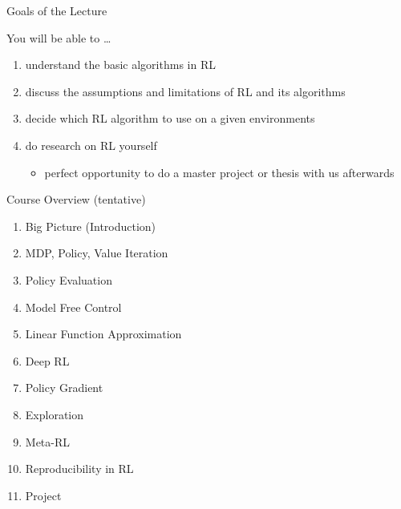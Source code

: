 \begin{frame}[c]{Goals of the Lecture}
	
	You will be able to \ldots
	\begin{enumerate}
		\item understand the basic algorithms in RL
		\smallskip
		\item discuss the assumptions and limitations of RL and its algorithms
		\smallskip
		\item decide which RL algorithm to use on a given environments
		\smallskip
		\item do research on RL yourself
		\begin{itemize}
			\item perfect opportunity to do a master project or thesis with us afterwards
		\end{itemize}
	\end{enumerate}
	
\end{frame}
\begin{frame}[c]{Course Overview (tentative)}
	
	\begin{enumerate}
		\item Big Picture (Introduction)
		\item MDP, Policy, Value Iteration
		\item Policy Evaluation
		\item Model Free Control
		\item Linear Function Approximation
		\item Deep RL
		\item Policy Gradient
		\item Exploration
		\item Meta-RL
		\item Reproducibility in RL
		\item Project
	\end{enumerate}
	
	
\end{frame}
